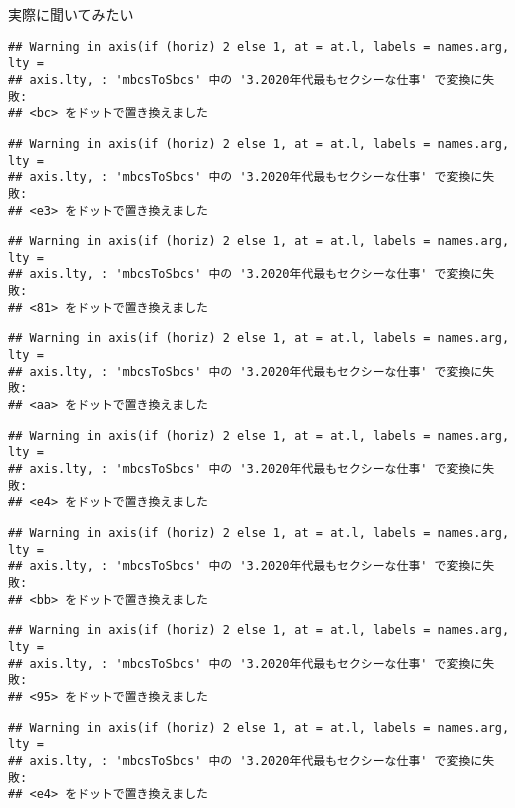 \documentclass[ignorenonframetext,]{beamer}
\begin{document}
\begin{frame}[fragile]{実際に聞いてみたい}
\begin{verbatim}
## Warning in axis(if (horiz) 2 else 1, at = at.l, labels = names.arg, lty =
## axis.lty, : 'mbcsToSbcs' 中の '3.2020年代最もセクシーな仕事' で変換に失敗:
## <bc> をドットで置き換えました
\end{verbatim}

\begin{verbatim}
## Warning in axis(if (horiz) 2 else 1, at = at.l, labels = names.arg, lty =
## axis.lty, : 'mbcsToSbcs' 中の '3.2020年代最もセクシーな仕事' で変換に失敗:
## <e3> をドットで置き換えました
\end{verbatim}

\begin{verbatim}
## Warning in axis(if (horiz) 2 else 1, at = at.l, labels = names.arg, lty =
## axis.lty, : 'mbcsToSbcs' 中の '3.2020年代最もセクシーな仕事' で変換に失敗:
## <81> をドットで置き換えました
\end{verbatim}

\begin{verbatim}
## Warning in axis(if (horiz) 2 else 1, at = at.l, labels = names.arg, lty =
## axis.lty, : 'mbcsToSbcs' 中の '3.2020年代最もセクシーな仕事' で変換に失敗:
## <aa> をドットで置き換えました
\end{verbatim}

\begin{verbatim}
## Warning in axis(if (horiz) 2 else 1, at = at.l, labels = names.arg, lty =
## axis.lty, : 'mbcsToSbcs' 中の '3.2020年代最もセクシーな仕事' で変換に失敗:
## <e4> をドットで置き換えました
\end{verbatim}

\begin{verbatim}
## Warning in axis(if (horiz) 2 else 1, at = at.l, labels = names.arg, lty =
## axis.lty, : 'mbcsToSbcs' 中の '3.2020年代最もセクシーな仕事' で変換に失敗:
## <bb> をドットで置き換えました
\end{verbatim}

\begin{verbatim}
## Warning in axis(if (horiz) 2 else 1, at = at.l, labels = names.arg, lty =
## axis.lty, : 'mbcsToSbcs' 中の '3.2020年代最もセクシーな仕事' で変換に失敗:
## <95> をドットで置き換えました
\end{verbatim}

\begin{verbatim}
## Warning in axis(if (horiz) 2 else 1, at = at.l, labels = names.arg, lty =
## axis.lty, : 'mbcsToSbcs' 中の '3.2020年代最もセクシーな仕事' で変換に失敗:
## <e4> をドットで置き換えました
\end{verbatim}


\end{frame}
\end{document}
